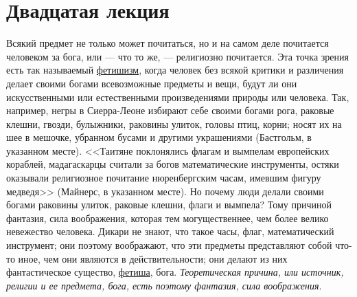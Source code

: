 \documentclass[12pt]{article}
\begin{document}
{}
\section*{Двадцатая лекция}

Всякий предмет не только может почитаться, но и на самом деле почитается человеком за бога, или --- что то же, --- религиозно почитается. Эта точка зрения есть так называемый \underline{фетишизм}, когда человек без всякой критики и различения делает своими богами всевозможные предметы и вещи, будут ли они искусственными или естественными произведениями природы или человека. Так, например, негры в Сиерра-Леоне избирают себе своими богами рога, раковые клешни, гвозди, булыжники, раковины улиток, головы птиц, корни; носят их на шее в мешочке, убранном бусами и другими украшениями (Бастгольм, в указанном месте). <<Таитяне поклонялись флагам и вымпелам европейских кораблей, мадагаскарцы считали за богов математические инструменты, остяки оказывали религиозное почитание нюренбергским часам, имевшим фигуру медведя>> (Майнерс, в указанном месте). Но почему люди делали своими богами раковины улиток, раковые клешни, флаги и вымпела? Тому причиной фантазия, сила воображения, которая тем могущественнее, чем более велико невежество человека. Дикари не знают, что такое часы, флаг, математический инструмент; они поэтому воображают, что эти предметы представляют собой что-то иное, чем они являются в действительности; они делают из них фантастическое существо, \underline{фетиша}, бога. \emph{Теоретическая причина, или источник, религии и ее предмета, бога, есть поэтому фантазия, сила воображения}. 
\end{document}
